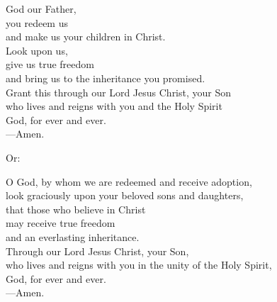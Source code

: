 \prayer


\begin{prayerverse}
God our Father,\\
you redeem us\\
and make us your children in Christ.\\
Look upon us,\\
give us true freedom\\
and bring us to the inheritance you promised.\\
Grant this through our Lord Jesus Christ, your Son\\
who lives and reigns with you and the Holy Spirit\\
God, for ever and ever.\\
{\color{red}---\thinspace}Amen.

{\color{red}Or:}

O God, by whom we are redeemed and receive adoption,\\
look graciously upon your beloved sons and daughters,\\
that those who believe in Christ\\
may receive true freedom\\
and an everlasting inheritance.\\
Through our Lord Jesus Christ, your Son,\\
who lives and reigns with you in the unity of the Holy Spirit,\\
God, for ever and ever.\\
{\color{red}---\thinspace}Amen.
\end{prayerverse}

